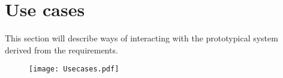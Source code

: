 \section{Use cases}\label{sec:usecases}

This section will describe ways of interacting with the prototypical system derived from the requirements.

\begin{figure}
 \centering 
 \texttt{[image: Usecases.pdf]}
\end{figure}
